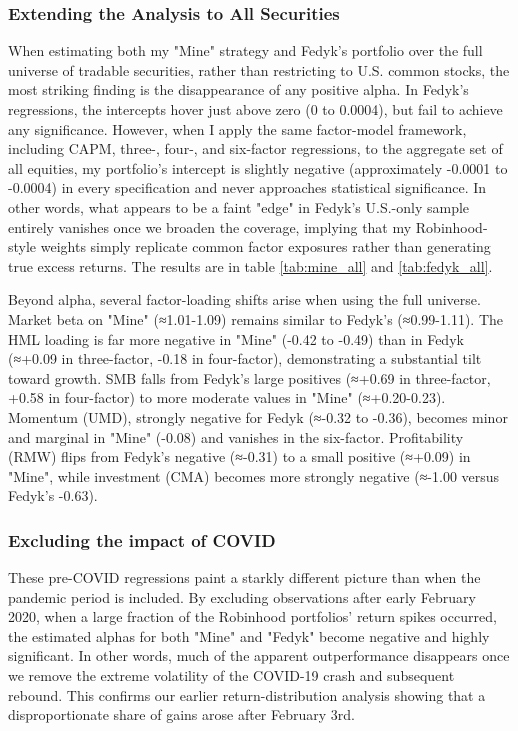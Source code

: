 \subsubsection{Extending the Analysis to All Securities}
When estimating both my "Mine" strategy and Fedyk's portfolio over the full universe of tradable securities, rather than restricting to U.S. common stocks, the most striking finding is the disappearance of any positive alpha. 
In Fedyk's regressions, the intercepts hover just above zero (0 to 0.0004), but fail to achieve any significance. 
However, when I apply the same factor-model framework, including CAPM, three-, four-, and six-factor regressions, to the aggregate set of all equities, my portfolio's intercept is slightly negative (approximately -0.0001 to -0.0004) in every specification and never approaches statistical significance. 
In other words, what appears to be a faint "edge" in Fedyk's U.S.-only sample entirely vanishes once we broaden the coverage, implying that my Robinhood-style weights simply replicate common factor exposures rather than generating true excess returns.
The results are in table \ref{tab:mine_all} and \ref{tab:fedyk_all}.

Beyond alpha, several factor-loading shifts arise when using the full universe. 
Market beta on "Mine" (≈1.01-1.09) remains similar to Fedyk's (≈0.99-1.11). 
The HML loading is far more negative in "Mine" (-0.42 to -0.49) than in Fedyk (≈+0.09 in three-factor, -0.18 in four-factor), demonstrating a substantial tilt toward growth. 
SMB falls from Fedyk's large positives (≈+0.69 in three-factor, +0.58 in four-factor) to more moderate values in "Mine" (≈+0.20-0.23).
Momentum (UMD), strongly negative for Fedyk (≈-0.32 to -0.36), becomes minor and marginal in "Mine" (-0.08) and vanishes in the six-factor. 
Profitability (RMW) flips from Fedyk's negative (≈-0.31) to a small positive (≈+0.09) in "Mine", while investment (CMA) becomes more strongly negative (≈-1.00 versus Fedyk's -0.63). 

\subsubsection{Excluding the impact of COVID}
These pre-COVID regressions paint a starkly different picture than when the pandemic period is included.  
By excluding observations after early February 2020, when a large fraction of the Robinhood portfolios' return spikes occurred, the estimated alphas for both "Mine" and "Fedyk" become negative and highly significant.  
In other words, much of the apparent outperformance disappears once we remove the extreme volatility of the COVID-19 crash and subsequent rebound.  
This confirms our earlier return-distribution analysis showing that a disproportionate share of gains arose after February 3rd.  

